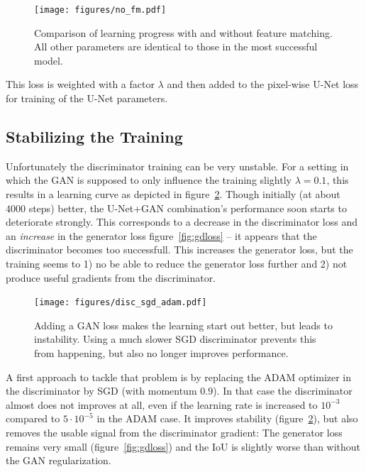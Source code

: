 \documentclass[aps,prl,twocolumn,groupedaddress,amsmath,amssymb]{revtex4-1}
\begin{document}
     \begin{figure}[tbp]
        \begin{center}
        \texttt{[image: figures/no\_fm.pdf]}
        \end{center}
        \caption{Comparison of learning progress with and without feature matching. All other 
        parameters are identical to those in the most successful model.}
        \label{fig:gan_fm}
    \end{figure}

    This loss is weighted with a factor $\lambda$ and then added to the pixel-wise U-Net loss for 
    training of the U-Net parameters.

    \subsection{Stabilizing the Training}

    Unfortunately the discriminator training can be very unstable. For a setting in which the GAN is
    supposed to only influence the training slightly $\lambda=0.1$, this results in a learning curve
    as depicted in figure~\ref{fig:gan_adam}. Though initially (at about $4000$ steps) better, the
    U-Net+GAN combination's performance soon starts to deteriorate strongly. This corresponds to a
    decrease in the discriminator loss and an \emph{increase} in the
    generator loss figure~\ref{fig:gdloss} -- it appears that the discriminator becomes too
    successfull. This  increases the generator loss, but the training seems to 1) no be able to
    reduce the generator  loss further and 2) not produce useful gradients from the discriminator.

    \begin{figure}[tbp]
        \begin{center}
        \texttt{[image: figures/disc\_sgd\_adam.pdf]}
        \end{center}
        \caption{Adding a GAN loss makes the learning start out better, but leads to instability. 
        Using a much slower SGD discriminator prevents this from happening, but also no longer 
        improves performance.}
        \label{fig:gan_adam}
    \end{figure}

    A first approach to tackle that problem is by replacing the ADAM optimizer in the discriminator
    by SGD (with momentum $0.9$). In that case the discriminator almost does not improves at all,
    even if the learning rate is increased to $10^{-3}$ compared to $5\cdot10^{-5}$ in the ADAM
    case.  It improves stability (figure~\ref{fig:gan_adam}), but also removes the usable signal
    from the discriminator gradient: The generator loss remains very small (figure~\ref{fig:gdloss})
    and the IoU is slightly worse than without the GAN regularization.
\end{document}
